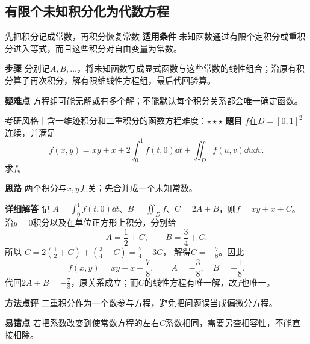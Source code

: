 \subsection{有限个未知积分化为代数方程}\label{cmi:finiterank}
\begin{method}{先把积分记成常数，再积分恢复常数}
\textbf{适用条件} 未知函数通过有限个定积分或重积分进入等式，而且这些积分对自由变量为常数。\par
\textbf{步骤} 分别记$A,B,\ldots$，将未知函数写成显式函数与这些常数的线性组合；沿原有积分算子再次积分，解有限维线性方程组，最后代回验算。\par
\textbf{疑难点} 方程组可能无解或有多个解；不能默认每个积分关系都会唯一确定函数。
\end{method}
\begin{example}{考研风格｜含一维迹积分和二重积分的函数方程}{难度：$\star\star\star$}
\label{cmi:ex:finiterank}
\textbf{题目} $f$在$D=[0,1]^2$连续，并满足
\[
f(x,y)=xy+x+2\int_0^1f(t,0)\dd t+\iint_Df(u,v)\dd u\dd v.
\]
求$f$。\par
\textbf{思路} 两个积分与$x,y$无关；先合并成一个未知常数。\par
\textbf{详细解答} 记
$A=\int_0^1f(t,0)\dd t$、$B=\iint_D f$、$C=2A+B$，则$f=xy+x+C$。
沿$y=0$积分以及在单位正方形上积分，分别给
\[
A=\dfrac12+C,\qquad B=\dfrac34+C.
\]
所以
$C=2(\frac12+C)+(\frac34+C)=\frac74+3C$，
解得$C=-\frac{7}{8}$。因此
\[
f(x,y)=xy+x-\dfrac78,\qquad A=-\dfrac38,\quad B=-\dfrac18.
\]
代回$2A+B=-\frac{7}{8}$，原关系成立；而$C$的线性方程有唯一解，故$f$也唯一。\par
\textbf{方法点评} 二重积分作为一个数参与方程，避免把问题误当成偏微分方程。\par
\textbf{易错点} 若把系数改变到使常数方程的左右$C$系数相同，需要另查相容性，不能直接相除。
\end{example}


